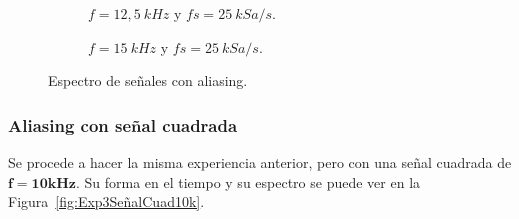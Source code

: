       \begin{figure}[H]
        \centering
        \begin{subfigure}[H]{0.48\textwidth}
          \caption{$f=12,5~kHz$ y $fs=25~kSa/s$.}
          \label{fig:Exp3AliasSeñal12_5kHz}
        \end{subfigure}
        \hfill 
        \begin{subfigure}[H]{0.48\textwidth}
          \caption{$f=15~kHz$ y $fs=25~kSa/s$.}
          \label{fig:Exp3AliasSeñal15kHz}
        \end{subfigure}

        \caption{Espectro de señales con aliasing.}
        \label{fig:Exp3SeñalConAlias}
      \end{figure}

      \subsubsection*{Aliasing con señal cuadrada}
      Se procede a hacer la misma experiencia anterior, pero con una señal cuadrada de $\mathbf{f=10kHz}$.
      Su forma en el tiempo y su espectro se puede ver en la Figura~\ref{fig:Exp3SeñalCuad10k}.


